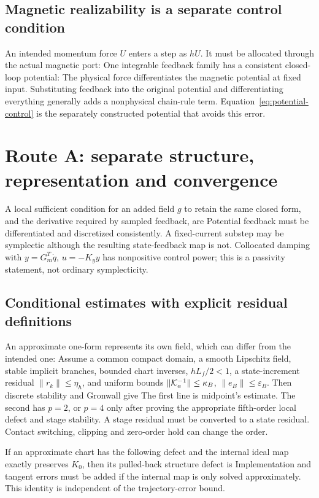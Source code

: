 \subsection{Magnetic realizability is a separate control condition}
An intended momentum force $U$ enters a step as $hU$. It must be allocated through the actual magnetic port:
\EqAllocation
One integrable feedback family has a consistent closed-loop potential:
\EqPotentialControl
The physical force differentiates the magnetic potential at fixed input. Substituting feedback into the original potential and differentiating everything generally adds a nonphysical chain-rule term. Equation~\eqref{eq:potential-control} is the separately constructed potential that avoids this error.

\PaperPage
\section{Route A: separate structure, representation and convergence}
A local sufficient condition for an added field $g$ to retain the same closed form, and the derivative required by sampled feedback, are
\EqControlDerivative
Potential feedback must be differentiated and discretized consistently. A fixed-current substep may be symplectic although the resulting state-feedback map is not. Collocated damping with $y=G_m^T\dot q$, $u=-K_y y$ has nonpositive control power; this is a passivity statement, not ordinary symplecticity.

\subsection{Conditional estimates with explicit residual definitions}
An approximate one-form represents its own field, which can differ from the intended one:
\EqRepresentationError
Assume a common compact domain, a smooth Lipschitz field, stable implicit branches, bounded chart inverses, $hL_f/2<1$, a state-increment residual $\|r_k\|\le\eta_h$, and uniform bounds $\|\mathcal K_a^{-1}\|\le\kappa_B$, $\|e_B\|\le\varepsilon_B$. Then discrete stability and Gronwall give
\EqConvergence
The first line is midpoint's estimate. The second has $p=2$, or $p=4$ only after proving the appropriate fifth-order local defect and stage stability. A stage residual must be converted to a state residual. Contact switching, clipping and zero-order hold can change the order.

If an approximate chart has the following defect and the internal ideal map exactly preserves $K_0$, then its pulled-back structure defect is
\EqChartError
Implementation and tangent errors must be added if the internal map is only solved approximately. This identity is independent of the trajectory-error bound.

